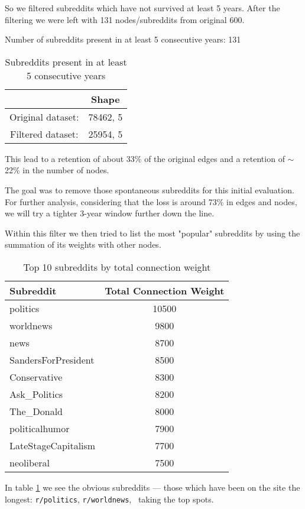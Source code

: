 \documentclass{article}
\begin{document}
So we filtered subreddits which have not survived at least 5 years. After the filtering we were left with 131 nodes/subreddits from original 600.

Number of subreddits present in at least 5 consecutive years: 131

\begin{table}[h]
\centering
\begin{tabular}{cc}
\hline
& Shape\\
\hline
Original dataset: &   78462, 5 \\
Filtered dataset: &   25954, 5 \\
\hline
\end{tabular}
\vspace{10pt}
\caption{Subreddits present in at least 5 consecutive years}
\end{table}%

This lead to a retention of about 33\% of the original edges and a retention of  $\sim$22\% in the number of nodes. 

The goal was to remove those spontaneous subreddits for this initial evaluation. For further analysis, considering that the loss is around 73\% in edges and nodes, we will try a tighter 3-year window further down the line.

Within this filter we then tried to list the most "popular" subreddits by using the summation of its weights with other nodes.

\begin{table}[h]
\centering
\begin{tabular}{lc}
\hline
Subreddit & Total Connection Weight \\
\hline
politics & 10500 \\
worldnews & 9800 \\
news & 8700 \\
SandersForPresident & 8500 \\
Conservative & 8300 \\
Ask\_Politics & 8200 \\
The\_Donald & 8000 \\
politicalhumor & 7900 \\
LateStageCapitalism & 7700 \\
neoliberal & 7500 \\
\hline
\end{tabular}
\vspace{10pt}
\caption{Top 10 subreddits by total connection weight}
\label{tab:top10}
\end{table}%
\newpage
In table \ref{tab:top10} we see the obvious subreddits --- those which have been on the site the longest: \texttt{r/politics}, \texttt{r/worldnews}, \textellipsis\ taking the top spots. 
\end{document}
